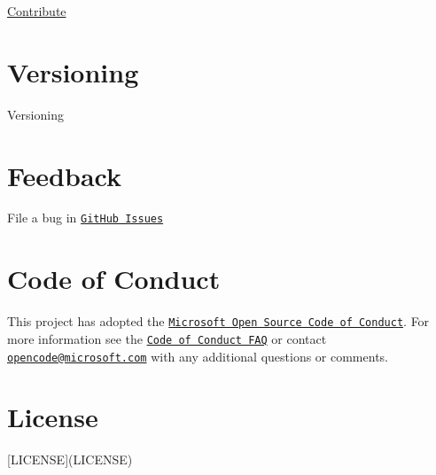 \mbox{\hyperlink{CONTRIBUTING_8md}{Contribute}}

\section*{Versioning}

Versioning

\section*{Feedback}


\begin{DoxyItemize}
\item File a bug in \href{https://github.com/Microsoft/onnxruntime/issues}{\tt Git\+Hub Issues}
\end{DoxyItemize}

\section*{Code of Conduct}

This project has adopted the \href{https://opensource.microsoft.com/codeofconduct/}{\tt Microsoft Open Source Code of Conduct}. For more information see the \href{https://opensource.microsoft.com/codeofconduct/faq/}{\tt Code of Conduct F\+AQ} or contact \href{mailto:opencode@microsoft.com}{\tt opencode@microsoft.\+com} with any additional questions or comments.

\section*{License}

\mbox{[}L\+I\+C\+E\+N\+SE\mbox{]}(L\+I\+C\+E\+N\+SE) 